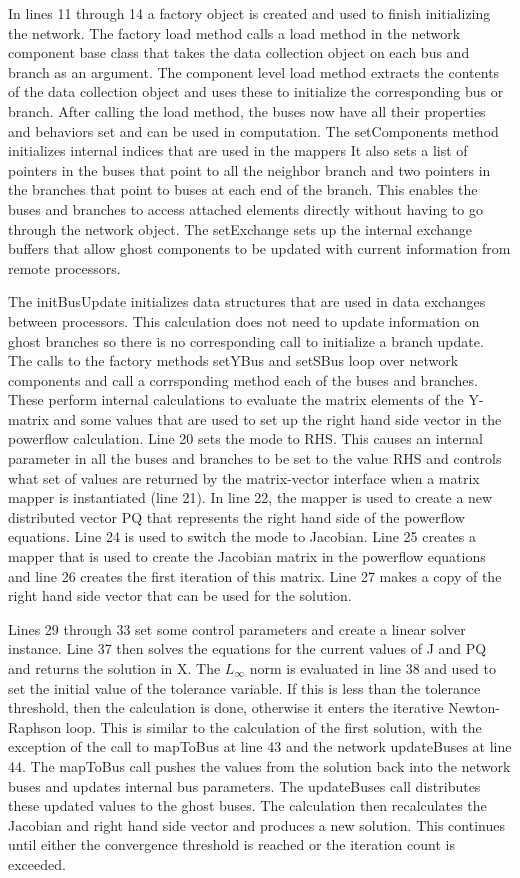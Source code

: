 \documentclass[preprint]{acm_proc_article-sp}
\begin{document}
In lines 11 through 14 a factory object is created and used to finish
initializing the network. The factory load method calls a load method in the
network component base class that takes the data collection object on each bus
and branch as an argument. The component level load method extracts the contents
of the data collection object and uses these to initialize the corresponding bus
or branch. After calling the load method, the buses now have all their
properties and behaviors set and can be used in computation.
The setComponents method initializes internal
indices that are used in the mappers It also sets a list of pointers in the
buses that point to all the neighbor branch and two pointers in the branches
that point to buses at each end of the branch. This enables the buses and
branches to access attached elements directly without having to go through the
network object. The setExchange sets up the internal exchange buffers that allow
ghost components to be updated with current information from remote processors.

The initBusUpdate initializes data structures that are used in data exchanges
between processors. This calculation does not need to update information on
ghost branches so there is no corresponding call to initialize a branch update.
The calls to the factory methods setYBus and setSBus loop over network
components and call a corrsponding method each of the buses and branches. These
perform internal calculations to evaluate the matrix elements of the Y-matrix
and some values that are used to set up the right hand side vector in the
powerflow calculation. Line 20 sets the mode to RHS. This causes an internal
parameter in all the buses and branches to be set to the value RHS and controls
what set of values are returned by the matrix-vector interface when a matrix
mapper is instantiated (line 21). In line 22, the mapper is used to create a new
distributed vector PQ that represents the right hand side of the powerflow
equations. Line 24 is used to switch the mode to Jacobian. Line 25 creates a
mapper that is used to create the Jacobian matrix in the powerflow equations and
line 26 creates the first iteration of this matrix. Line 27 makes a copy of the
right hand side vector that can be used for the solution.

Lines 29 through 33 set some control parameters and create a linear solver
instance. Line 37 then solves the equations for the current values of J and PQ
and returns the solution in X. The $L_{\infty}$ norm is evaluated in line 38 and
used
to set the initial value of the tolerance variable. If this is less than the
tolerance threshold, then the calculation is done, otherwise it enters the
iterative Newton-Raphson loop. This is similar to the calculation of the first
solution, with the exception of the call to mapToBus at line 43 and the network
updateBuses at line 44. The mapToBus call pushes the values from the solution back
into the network buses and updates internal bus parameters. The updateBuses call
distributes these updated values to the ghost buses. The calculation then
recalculates the Jacobian and right hand side vector and produces a new
solution. This continues until either the convergence threshold is reached or
the iteration count is exceeded.
\end{document}
